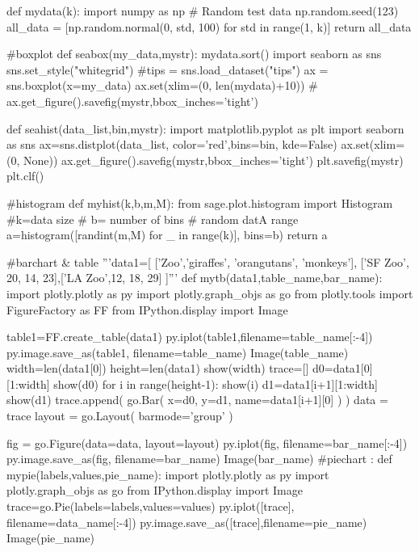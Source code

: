\begin{sagesilent}
def mydata(k):
    import numpy as np
    # Random test data
    np.random.seed(123)
    all_data = [np.random.normal(0, std, 100) for std in range(1, k)]
    return all_data

#boxplot
def seabox(my_data,mystr):
    mydata.sort()
    import seaborn as sns
    sns.set_style("whitegrid")
    #tips = sns.load_dataset("tips")
    ax = sns.boxplot(x=my_data)
    ax.set(xlim=(0, len(mydata)+10))    
#    ax.get_figure().savefig(mystr,bbox_inches='tight')
    
    
def seahist(data_list,bin,mystr):
    import matplotlib.pyplot as plt    
    import seaborn as sns
    ax=sns.distplot(data_list, color='red',bins=bin, kde=False)
    ax.set(xlim=(0, None))    
    ax.get_figure().savefig(mystr,bbox_inches='tight')
    plt.savefig(mystr)
    plt.clf()
    
    #histogram
def myhist(k,b,m,M):
    from sage.plot.histogram import Histogram
    #k=data size
    # b= number of bins
    # random datA range
    a=histogram([randint(m,M) for _ in range(k)], bins=b)
    return a

#barchart & table
'''data1=[
['Zoo','giraffes', 'orangutans', 'monkeys'], ['SF Zoo', 20, 14, 23],['LA Zoo',12, 18, 29]
]'''
def mytb(data1,table_name,bar_name):
    import plotly.plotly as py
    import plotly.graph_objs as go
    from plotly.tools import FigureFactory as FF 
    from IPython.display import Image

    table1=FF.create_table(data1)
    py.iplot(table1,filename=table_name[:-4])
    py.image.save_as(table1, filename=table_name)
    Image(table_name)
    width=len(data1[0])
    height=len(data1)
    show(width)
    trace=[]
    d0=data1[0][1:width]
    show(d0)
    for i in range(height-1):
        show(i)
        d1=data1[i+1][1:width]
        show(d1)
        trace.append(
            go.Bar(
            x=d0,
            y=d1,
            name=data1[i+1][0]
                   )
                     )
    data = trace
    layout = go.Layout(
        barmode='group'
    )

    fig = go.Figure(data=data, layout=layout)
    py.iplot(fig, filename=bar_name[:-4])
    py.image.save_as(fig, filename=bar_name)
    Image(bar_name)
#piechart :
def mypie(labels,values,pie_name):
    import plotly.plotly as py
    import plotly.graph_objs as go
    from IPython.display import Image
    trace=go.Pie(labels=labels,values=values)
    py.iplot([trace], filename=data_name[:-4])
    py.image.save_as([trace],filename=pie_name)
    Image(pie_name)
    
\end{sagesilent}


